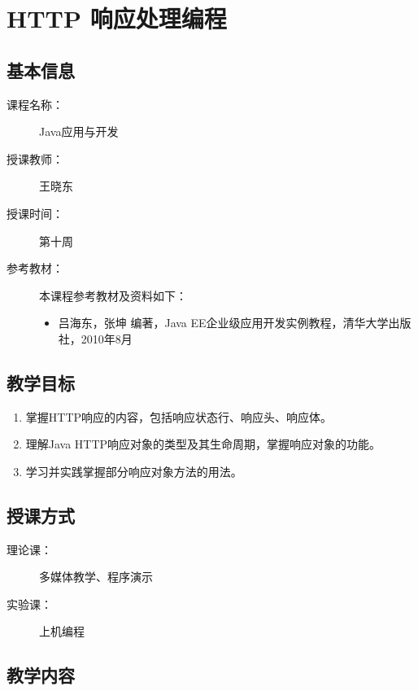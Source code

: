 \chapter*{HTTP 响应处理编程}
\label{chp:JavaEE-HTTP-response-handling}

\section*{基本信息}
\sline
\begin{description}
\item[课程名称：] Java应用与开发
\item[授课教师：] 王晓东
\item[授课时间：] 第十周
\item[参考教材：] 本课程参考教材及资料如下：
  \begin{itemize}
  \item 吕海东，张坤 编著，Java EE企业级应用开发实例教程，清华大学出版社，2010年8月
  \end{itemize}
\end{description}

\section*{教学目标}

\sline

\begin{enumerate}
\item 掌握HTTP响应的内容，包括响应状态行、响应头、响应体。
\item 理解Java HTTP响应对象的类型及其生命周期，掌握响应对象的功能。
\item 学习并实践掌握部分响应对象方法的用法。
\end{enumerate}  

\section*{授课方式}

\sline
\begin{description}
\item[理论课：] 多媒体教学、程序演示
\item[实验课：] 上机编程
\end{description}

\newpage
\section*{教学内容}
\sline

